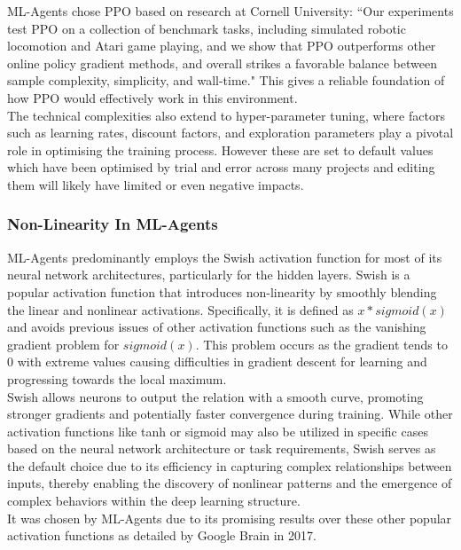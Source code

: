 \documentclass{article}
\begin{document}
 ML-Agents chose PPO based on research at Cornell University: ``Our experiments test PPO on a collection of benchmark tasks, including simulated robotic locomotion and Atari game playing, and we show that PPO outperforms other online policy gradient methods, and overall strikes a favorable balance between sample complexity, simplicity, and wall-time." \cite{PPO-Algorithms} This gives a reliable foundation of how PPO would effectively work in this environment.\\

 The technical complexities also extend to hyper-parameter tuning, where factors such as learning rates, discount factors, and exploration parameters play a pivotal role in optimising the training process. However these are set to default values which have been optimised by trial and error across many projects and editing them will likely have limited or even negative impacts.

\subsubsection{Non-Linearity In ML-Agents}
ML-Agents predominantly employs the Swish activation function for most of its neural network architectures, particularly for the hidden layers. Swish is a popular activation function that introduces non-linearity by smoothly blending the linear and nonlinear activations. Specifically, it is defined as $x*sigmoid(x)$ and avoids previous issues of other activation functions such as the vanishing gradient problem for $sigmoid(x)$. This problem occurs as the gradient tends to 0 with extreme values causing difficulties in gradient descent for learning and progressing towards the local maximum.\\ 

Swish allows neurons to output the relation with a smooth curve, promoting stronger gradients and potentially faster convergence during training. While other activation functions like tanh or sigmoid may also be utilized in specific cases based on the neural network architecture or task requirements, Swish serves as the default choice due to its efficiency in capturing complex relationships between inputs, thereby enabling the discovery of nonlinear patterns and the emergence of complex behaviors within the deep learning structure.\\

It was chosen by ML-Agents due to its promising results over these other popular activation functions as detailed by Google Brain in 2017.
\end{document}
